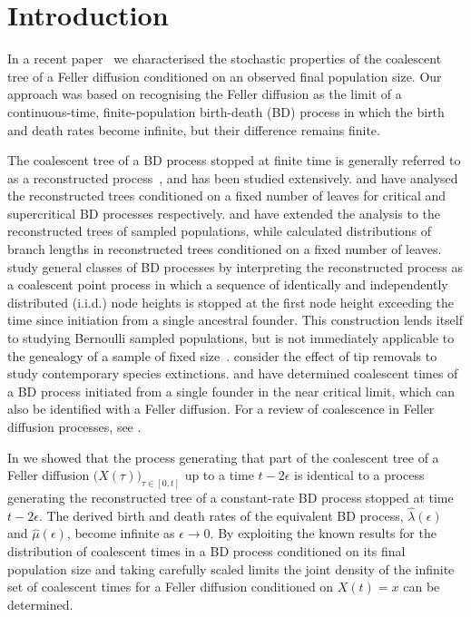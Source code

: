 \documentclass[preprint,12pt]{elsarticle}
\begin{document}
\section{Introduction}
\label{sec:Introduction}

In a recent paper~\citep{BurdenGriffiths24} we characterised the stochastic properties of the coalescent tree of a Feller diffusion 
conditioned on an observed final population size.  Our approach was based on recognising the Feller diffusion as the limit 
of a continuous-time, finite-population birth-death (BD) process in which the birth and death rates become infinite, but their difference 
remains finite.  

The coalescent tree of a BD process stopped at finite time is generally referred to as a reconstructed process~\citep{Nee94}, 
and has been studied extensively. \cite{Aldous05} and \citet{Gernhard08} have analysed the reconstructed trees conditioned on a fixed number of 
leaves for critical and supercritical BD processes respectively.  
\citet{Stadler09} and \citet{Wiuf18} have extended the analysis to the reconstructed trees of sampled populations, while \citet{Stadler12} 
calculated distributions of branch lengths in reconstructed trees conditioned on a fixed number of leaves.  
\citet{Lambert13b} study general classes of BD processes by interpreting the reconstructed process as a coalescent point process 
in which a sequence of identically and independently distributed (i.i.d.) node heights is stopped at the first node height exceeding 
the time since initiation from a single ancestral founder.  This construction lends itself to studying Bernoulli sampled populations, but is not 
immediately applicable to the genealogy of a sample of fixed size~\citep{Lambert18}.  \citet{Lambert13c} consider the effect of tip removals 
to study contemporary species extinctions. 
\citet{o1995genealogy} and \cite{Harris20} have determined coalescent times of a BD process initiated from 
a single founder in the near critical limit, which can also be identified with a Feller diffusion. 
For a review of coalescence in Feller diffusion processes, see \citet{BurdenGriffiths25a}. 

In \citet[Section~5]{BurdenGriffiths24} we showed that the process generating that part of the coalescent tree of a Feller diffusion $\big(X(\tau)\big)_{\tau \in [0, t]}$ 
up to a time $t - 2\epsilon$ is identical to a process generating the reconstructed tree of a constant-rate BD process stopped at time $t - 2\epsilon$.  The derived birth and 
death rates of the equivalent BD process, $\hat\lambda(\epsilon)$ and $\hat\mu(\epsilon)$, become infinite as $\epsilon \to 0$.  By exploiting the known results for the 
distribution of coalescent times in a BD process conditioned on its final population size and taking carefully scaled limits the joint density of the infinite set of 
coalescent times for a Feller diffusion conditioned on $X(t) = x$ can be determined.  
\end{document}
